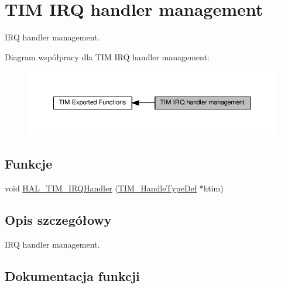 \hypertarget{group___t_i_m___exported___functions___group7}{}\section{T\+IM I\+RQ handler management}
\label{group___t_i_m___exported___functions___group7}


I\+RQ handler management.  


Diagram współpracy dla T\+IM I\+RQ handler management\+:\nopagebreak
\begin{figure}[H]
\begin{center}
\leavevmode
\includegraphics[width=350pt]{group___t_i_m___exported___functions___group7}
\end{center}
\end{figure}
\subsection*{Funkcje}
\begin{DoxyCompactItemize}
\item 
void \hyperlink{group___t_i_m___exported___functions___group7_ga2dc3ef34340412aa8a01d734d2ff8f88}{H\+A\+L\+\_\+\+T\+I\+M\+\_\+\+I\+R\+Q\+Handler} (\hyperlink{struct_t_i_m___handle_type_def}{T\+I\+M\+\_\+\+Handle\+Type\+Def} $\ast$htim)
\end{DoxyCompactItemize}


\subsection{Opis szczegółowy}
I\+RQ handler management. 



\subsection{Dokumentacja funkcji}
\mbox{\label{group___t_i_m___exported___functions___group7_ga2dc3ef34340412aa8a01d734d2ff8f88}} 
